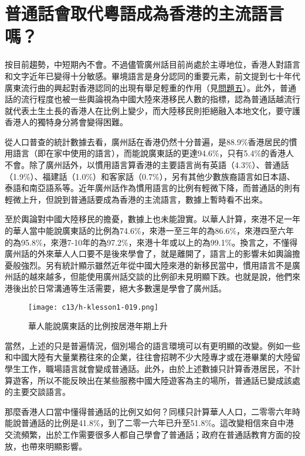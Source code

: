 \section{普通話會取代粵語成為香港的主流語言嗎？}
\label{sec:sec13}

按目前趨勢，中短期內不會。不過儘管廣州話目前尚處於主導地位，香港人對語言和文字近年已變得十分敏感。畢境語言是身分認同的重要元素，前文提到七十年代廣東流行曲的興起對香港認同的出現有舉足輕重的作用（見\hyperref[sec:sec5]{問題五}）。此外，普通話的流行程度也被一些輿論視為中國大陸來港移民人數的指標，認為普通話越流行就代表土生土長的香港人在比例上變少，而大陸移民則拒絕融入本地文化，要守護香港人的獨特身分將會變得困難。

從人口普查的統計數據去看，廣州話在香港仍然十分普遍，是88.9\%香港居民的慣用語言（即在家中使用的語言），而能說廣東話的更達94.6\%，只有5.4\%的香港人不會。除了廣州話外，以慣用語言算香港的主要語言尚有英語（4.3\%）、普通話（1.9\%）、福建話（1.0\%）和客家話（0.7\%），另有其他少數族裔語言如日本語、泰語和南亞語系等。近年廣州話作為慣用語言的比例有輕微下降，而普通話的則有輕微上升，但說到普通話要成為香港的主流語言，數據上暫時看不出來。

至於輿論對中國大陸移民的擔憂，數據上也未能證實。以華人計算，來港不足一年的華人當中能說廣東話的比例為74.6\%，來港一至三年的為86.6\%，來港四至六年的為95.8\%，來港7-10年的為97.2\%，來港十年或以上的為99.1\%。換言之，不懂得廣州話的外來華人人口要不是後來學會了，就是離開了，語言上的影響未如輿論擔憂般強烈。另有統計顯示雖然近年從中國大陸來港的新移民當中，慣用語言不是廣州話的越來越多，但能使用廣州話交談的比例卻未見明顯下跌。也就是說，他們來港後出於日常溝通等生活需要，絕大多數還是學會了廣州話。

\begin{figure}[htbp]
    \centering
    \texttt{[image: c13/h-klesson1-019.png]}
    \caption{華人能說廣東話的比例按居港年期上升} 
\end{figure}

當然，上述的只是普遍情況，個別場合的語言環境可以有更明顯的改變。例如一些和中國大陸有大量業務往來的企業，往往會招聘不少大陸專才或在港畢業的大陸留學生工作，職場語言就會變成普通話。此外，由於上述數據只計算香港居民，不計算遊客，所以不能反映出在某些服務中國大陸遊客為主的場所，普通話已變成該處的主要交談語言。

那麼香港人口當中懂得普通話的比例又如何？同樣只計算華人人口，二零零六年時能說普通話的比例是41.8\%，到了二零一六年已升至51.8\%。這改變相信來自中港交流頻繁，出於工作需要很多人都自己學會了普通話；政府在普通話教育方面的投放，也帶來明顯影響。

